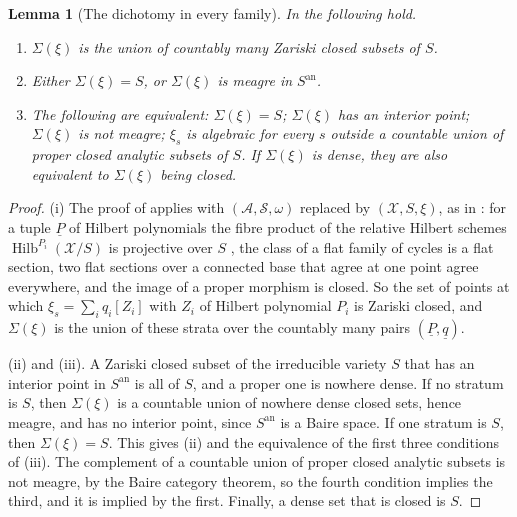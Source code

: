 \documentclass[11pt,reqno]{amsart}
\theoremstyle{plain}
\newtheorem{lemma}[theorem]{Lemma}
\theoremstyle{definition}
\theoremstyle{remark}
\newcommand{\cA}{\mathcal{A}}
\newcommand{\cS}{\mathcal{S}}
\newcommand{\cX}{\mathcal{X}}
\DeclareMathOperator{\Hilb}{Hilb}
\begin{document}
\begin{lemma}[The dichotomy in every family]\label{lem:algstrata}
In  the following hold.
\begin{enumerate}[label=\textup{(\roman*)},leftmargin=2.6em,itemsep=2pt]
\item $\Sigma(\xi)$ is the union of countably many Zariski closed subsets of
  $S$.
\item Either $\Sigma(\xi)=S$, or $\Sigma(\xi)$ is meagre in $S^{\mathrm{an}}$.
\item The following are equivalent: $\Sigma(\xi)=S$; $\Sigma(\xi)$ has an
  interior point; $\Sigma(\xi)$ is not meagre; $\xi_{s}$ is algebraic for
  every $s$ outside a countable union of proper closed analytic subsets of
  $S$. If $\Sigma(\xi)$ is dense, they are also equivalent to $\Sigma(\xi)$
  being closed.
\end{enumerate}
\end{lemma}

\begin{proof}
(i) The proof of \cite[Theorem~16.4]{paperI} applies with
$(\cA,\cS,\omega)$ replaced by $(\cX,S,\xi)$, as in :
for a tuple $\underline{P}$ of Hilbert polynomials the fibre product of the
relative Hilbert schemes $\Hilb^{P_{i}}(\cX/S)$ is projective over $S$
\cite{Gro61}, the class of a flat family of cycles is a flat section, two flat
sections over a connected base that agree at one point agree everywhere, and
the image of a proper morphism is closed. So the set of points at which
$\xi_{s}=\sum_{i}q_{i}[Z_{i}]$ with $Z_{i}$ of Hilbert polynomial $P_{i}$ is
Zariski closed, and $\Sigma(\xi)$ is the union of these strata over the
countably many pairs $(\underline{P},\underline{q})$.

(ii) and (iii). A Zariski closed subset of the irreducible variety $S$ that
has an interior point in $S^{\mathrm{an}}$ is all of $S$, and a proper one is
nowhere dense. If no stratum is $S$, then $\Sigma(\xi)$ is a countable union
of nowhere dense closed sets, hence meagre, and has no interior point, since
$S^{\mathrm{an}}$ is a Baire space. If one stratum is $S$, then
$\Sigma(\xi)=S$. This gives (ii) and the equivalence of the first three
conditions of (iii). The complement of a countable union of proper closed
analytic subsets is not meagre, by the Baire category theorem, so the fourth
condition implies the third, and it is implied by the first. Finally, a
dense set that is closed is $S$.
\end{proof}
\end{document}

